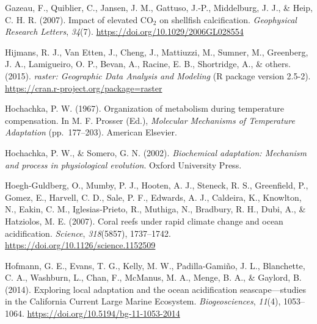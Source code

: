 \documentclass{CSUNthesis}
\begin{document}
\vspace{0.1em}

Gazeau, F., Quiblier, C., Jansen, J. M., Gattuso, J.-P., Middelburg, J. J., \& Heip, C. H. R. (2007). Impact of elevated CO\(_2\) on shellfish calcification. \textit{Geophysical Research Letters}, \textit{34}(7). \url{https://doi.org/10.1029/2006GL028554}

\vspace{0.1em}

\vspace{0.1em}

Hijmans, R. J., Van Etten, J., Cheng, J., Mattiuzzi, M., Sumner, M., Greenberg, J. A., Lamigueiro, O. P., Bevan, A., Racine, E. B., Shortridge, A., \& others. (2015). \textit{raster: Geographic Data Analysis and Modeling} (R package version 2.5-2). \url{https://cran.r-project.org/package=raster}

\vspace{0.1em}

Hochachka, P. W. (1967). Organization of metabolism during temperature compensation. In M. F. Prosser (Ed.), \textit{Molecular Mechanisms of Temperature Adaptation} (pp.~177--203). American Elsevier.

\vspace{0.1em}

Hochachka, P. W., \& Somero, G. N. (2002). \textit{Biochemical adaptation: Mechanism and process in physiological evolution}. Oxford University Press.

\vspace{0.1em}

Hoegh-Guldberg, O., Mumby, P. J., Hooten, A. J., Steneck, R. S., Greenfield, P., Gomez, E., Harvell, C. D., Sale, P. F., Edwards, A. J., Caldeira, K., Knowlton, N., Eakin, C. M., Iglesias-Prieto, R., Muthiga, N., Bradbury, R. H., Dubi, A., \& Hatziolos, M. E. (2007). Coral reefs under rapid climate change and ocean acidification. \textit{Science}, \textit{318}(5857), 1737--1742. \url{https://doi.org/10.1126/science.1152509}

\vspace{0.1em}

Hofmann, G. E., Evans, T. G., Kelly, M. W., Padilla-Gamiño, J. L., Blanchette, C. A., Washburn, L., Chan, F., McManus, M. A., Menge, B. A., \& Gaylord, B. (2014). Exploring local adaptation and the ocean acidification seascape---studies in the California Current Large Marine Ecosystem. \textit{Biogeosciences}, \textit{11}(4), 1053--1064. \url{https://doi.org/10.5194/bg-11-1053-2014}
\end{document}
